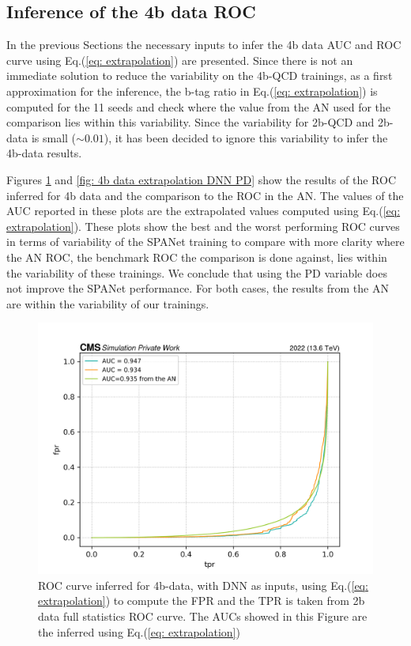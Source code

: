 \subsection{Inference of the 4b data ROC} \label{subsection:4b data extrapolation inclusivce}

In the previous Sections the necessary inputs to infer the 4b data AUC and ROC curve using Eq.(\ref{eq: extrapolation}) are presented. Since there is not an immediate solution to reduce the variability on the 4b-QCD trainings, as a first approximation for the inference, the b-tag ratio in Eq.(\ref{eq: extrapolation}) is computed for the 11 seeds and check where the value from the AN used for the comparison lies within this variability. Since the variability for 2b-QCD and 2b-data is small ($\sim 0.01$), it has been decided to ignore this variability to infer the 4b-data results.

Figures \ref{fig: 4b data extrapolation DNN} and \ref{fig: 4b data extrapolation DNN PD} show the results of the ROC inferred for 4b data and the comparison to the ROC in the AN. The values of the AUC reported in these plots are the extrapolated values computed using Eq.(\ref{eq: extrapolation}). These plots show the best and the worst performing ROC curves in terms of variability of the SPANet training to compare with more clarity where the AN ROC, the benchmark ROC the comparison is done against, lies within the variability of these trainings. We conclude that using the PD variable does not improve the SPANet performance. For both cases, the results from the AN are within the variability of our trainings. 

\begin{figure}[hbt]
    \centering
    \includegraphics[width=0.7\linewidth]{Images/7.S:B/Extrapolation/4b data dnn.png}
    \caption{ROC curve inferred for 4b-data, with DNN as inputs, using Eq.(\ref{eq: extrapolation}) to compute the FPR and the TPR is taken from 2b data full statistics ROC curve. The AUCs showed in this Figure are the inferred using Eq.(\ref{eq: extrapolation})}
    \label{fig: 4b data extrapolation DNN}
\end{figure}

